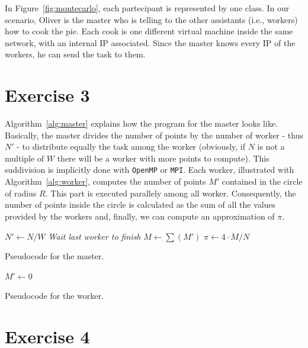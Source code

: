 \documentclass[a4paper]{article}
\begin{document}
In Figure~\ref{fig:montecarlo}, each partecipant is represented by one class. In our scenario, Oliver is the master who is telling to the other assistants (i.e., workers) how to cook the pie. Each cook is one different virtual machine inside the same network, with an internal IP associated. Since the master knows every IP of the workers, he can send the task to them.

\section{Exercise 3}

Algorithm~\ref{alg:master} explains how the program for the master looks like. Basically, the master divides the number of points by the number of worker - thus $N'$ - to distribute equally the task among the worker (obviously, if $N$ is not a multiple of $W$ there will be a worker with more points to compute). This suddivision is implicitly done with \texttt{OpenMP} or \texttt{MPI}. Each worker, illustrated with Algorithm~\ref{alg:worker}, computes the number of points $M'$ contained in the circle of radius $R$. This part is executed parallely among all worker. Consequently, the number of points inside the circle is calculated as the sum of all the values provided by the workers and, finally, we can compute an approximation of $\pi$.

\begin{algorithm}[htbp]
{}
$N' \leftarrow N/W$\;
\textit{Wait last worker to finish}\;
$M \leftarrow \sum(M')$\;
$\pi \leftarrow 4 \cdot M/N$\;
\caption{Pseudocode for the master.}
\label{alg:master}
\end{algorithm}

\begin{algorithm}[htbp]
{}
$M' \leftarrow 0$\;
\caption{Pseudocode for the worker.}
\label{alg:worker}
\end{algorithm}

\section{Exercise 4}
\end{document}

